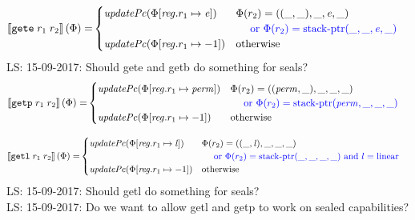 \documentclass[a4paper]{article}
\newcommand\lau[1]{{\color{purple} \sf \footnotesize {LS: #1}}\\}
\newcommand{\sem}[1]{\left\llbracket #1 \right\rrbracket}
\newcommand{\tand}{\text{ and }}
\newcommand{\tor}{\text{ or }}
\newcommand{\totherwise}{\text{otherwise }}
\newcommand{\sourcecolor}{\color{blue}}
\newcommand{\src}[1]{{\sourcecolor #1}}
\newcommand{\targetcolor}[1]{\color{black}}
\newcommand{\trg}[1]{{\targetcolor{} #1}}
\newcommand{\zinstr}[1]{\texttt{#1}}
\newcommand{\twoinstr}[3]{
  \ifthenelse{\equal{#2#3}{}}
  {\zinstr{#1}}
  {\zinstr{#1} \; #2 \; #3}
}
\newcommand{\tgete}[2]{\twoinstr{\trg{gete}}{#1}{#2}}
\newcommand{\tgetp}[2]{\twoinstr{\trg{getp}}{#1}{#2}}
\newcommand{\tgetlin}[2]{\twoinstr{\trg{getl}}{#1}{#2}}
\newcommand{\update}[2]{[#1 \mapsto #2]}
\newcommand{\updReg}[2]{\update{\reg.#1}{#2}}
\newcommand{\perm}{\var{perm}}
\newcommand{\lin}{\var{l}}
\newcommand{\stkptr}[1]{\mathrm{stack\text{-}ptr}(#1)}
\newcommand{\var}[1]{\mathit{#1}}
\newcommand{\reg}{\var{reg}}
\newcommand{\eaddr}{\var{e}}
\newcommand{\plainlinearity}[1]{\mathrm{#1}}
\newcommand{\linear}{\plainlinearity{linear}}
\newcommand{\plainfun}[2]{
  \ifthenelse{\equal{#2}{}}
  {\mathit{#1}}
  {\mathit{#1}(#2)}
}
\newcommand{\updPcAddr}[1]{\plainfun{updatePc}{#1}}
\begin{document}
\begin{align*}
  \sem{\tgete{r_1}{r_2}}(\Phi) = & 
                                   \begin{cases}
                                     \updPcAddr{\Phi\updReg{r_1}{\eaddr}} & 
                                     \arraycolsep=0pt
                                     \begin{array}[t]{l}
                                       \Phi(r_2) = ((\_,\_),\_,\eaddr,\_) \\
                                       \quad \src{\tor \Phi(r_2) = \stkptr{\_,\_,\eaddr,\_} } \\
                                     \end{array} \\
                                     \updPcAddr{\Phi\updReg{r_1}{-1}} & \totherwise
                                   \end{cases}
\end{align*}
\lau{15-09-2017: Should gete and getb do something for seals?}

\begin{align*}
  \sem{\tgetp{r_1}{r_2}}(\Phi) = & 
                                   \begin{cases}
                                     \updPcAddr{\Phi\updReg{r_1}{\perm}} & 
                                     \arraycolsep=0pt
                                     \begin{array}[t]{l}
                                       \Phi(r_2) = ((\perm,\_),\_,\_,\_) \\
                                       \quad \src{\tor \Phi(r_2) = \stkptr{\perm,\_,\_,\_} } \\
                                     \end{array} \\
                                     \updPcAddr{\Phi\updReg{r_1}{-1}} & \totherwise
                                   \end{cases}
\end{align*}

\begin{align*}
  \sem{\tgetlin{r_1}{r_2}}(\Phi) = & 
                                   \begin{cases}
                                     \updPcAddr{\Phi\updReg{r_1}{\lin}} & 
                                     \arraycolsep=0pt
                                     \begin{array}[t]{l}
                                       \Phi(r_2) = ((\_,\lin),\_,\_,\_) \\
                                       \quad \src{\tor \Phi(r_2) = \stkptr{\_,\_,\_,\_} \tand l = \linear}\\
                                     \end{array} \\
                                     \updPcAddr{\Phi\updReg{r_1}{-1}} & \totherwise
                                   \end{cases}
\end{align*}
\lau{15-09-2017: Should getl do something for seals?}
\lau{15-09-2017: Do we want to allow getl and getp to work on sealed capabilities?}
\end{document}
